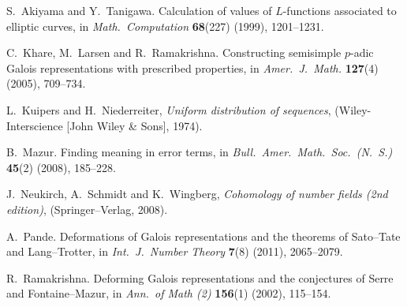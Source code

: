 \documentclass{article}
\begin{document}
\begin{thebibliography}{9}
S.~Akiyama and Y.~Tanigawa. Calculation of values of $L$-functions associated 
to elliptic curves, in \emph{Math.~Computation} \textbf{68}(227) (1999), 
1201--1231. 

C.~Khare, M.~Larsen and R.~Ramakrishna. Constructing semisimple $p$-adic Galois 
representations with prescribed properties, in \emph{Amer.~J.~Math.} 
\textbf{127}(4) (2005), 709--734. 

L.~Kuipers and H.~Niederreiter, \emph{Uniform distribution of sequences}, 
(Wiley-Interscience [John Wiley \& Sons], 1974).

B.~Mazur. Finding meaning in error terms, in 
\emph{Bull.~Amer.~Math.~Soc.~(N.~S.)} \textbf{45}(2) (2008), 185--228. 

J.~Neukirch, A.~Schmidt and K.~Wingberg, \emph{Cohomology of number fields (2nd edition)}, (Springer--Verlag, 2008). 

A.~Pande. Deformations of Galois representations and the theorems of Sato--Tate 
and Lang--Trotter, in \emph{Int.~J.~Number Theory} \textbf{7}(8) (2011), 
2065--2079. 

R.~Ramakrishna. Deforming Galois representations and the conjectures of Serre 
and Fontaine--Mazur, in \emph{Ann.~of Math (2)} \textbf{156}(1) (2002), 
115--154. 
\end{thebibliography}
\end{document}
